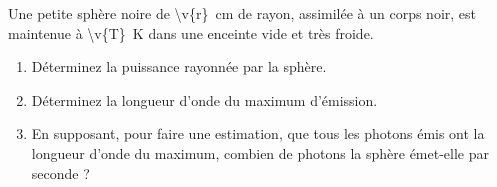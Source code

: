 Une petite sphère noire de \qty{\v{r}}{cm} de rayon, assimilée à un corps noir, est maintenue à \qty{\v{T}}{K} dans une enceinte vide et très froide.

\begin{enumerate}[label=\alph*)]
    \item Déterminez la puissance rayonnée par la sphère.
    \item Déterminez la longueur d'onde du maximum d'émission.
    \item En supposant, pour faire une estimation, que tous les photons émis ont la longueur d'onde du maximum, combien de photons la sphère émet-elle par seconde ?
\end{enumerate}
